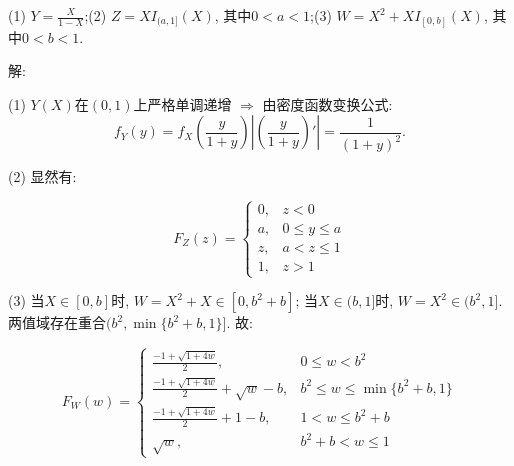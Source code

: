 \documentclass[standard]{ExBook}
\begin{document}
\begin{qitems}
\begin{bbox}
\begin{shaded}
(1) $Y=\frac{X}{1-X}$;\qquad(2) $Z=XI_{(a,1]}(X)$, 其中$0 < a < 1$;\qquad(3) $W=X^2+XI_{[0,b]}(X)$, 其中$0 < b < 1$.
    \end{shaded}
    \end{bbox}

\vspace{-5em}

    \begin{bbox}
解: 

(1) $Y(X)$在$(0,1)$上严格单调递增 $\Longrightarrow$ 由密度函数变换公式:
$$f_{Y}(y)=f_{X}(\displaystyle\frac{y}{1+y})\left|\left(\displaystyle\frac{y}{1+y}\right)'\right|=\displaystyle\frac{1}{(1+y)^2}.$$
    \end{bbox}

\vspace{-5em}

    \begin{bbox}
(2) 显然有:
\vspace{-2em}
\begin{center}
\begin{equation}
    F_{Z}(z)=
    \left\{
    \begin{array}{cl}
        \nonumber
        0, &z<0\\
        a, &0\leq y\leq a\\
        z, &a<z\leq 1\\
        1, &z>1
    \end{array}
    \right.
\end{equation}
\end{center}
(3) 当$X\in[0,b]$时, $W=X^2+X\in[0,b^2+b]$; 当$X\in(b,1]$时, $W=X^2\in(b^2,1]$. 两值域存在重合$(b^2,\min\{b^2+b,1\}]$. 故:
\vspace{-2em}
\begin{center}
\begin{equation}
    F_{W}(w)=
    \left\{
    \begin{array}{cl}
        \nonumber
        \displaystyle\frac{-1+\sqrt{1+4w}}{2}, &0\leq w<b^2\\
        \displaystyle\frac{-1+\sqrt{1+4w}}{2}+\sqrt{w}-b, &b^2\leq w\leq\min\{b^2+b,1\}\\
        \displaystyle\frac{-1+\sqrt{1+4w}}{2}+1-b, &1< w\leq b^2+b\\
        \sqrt{w}, &b^2+b<w\leq 1
    \end{array}
    \right.
\end{equation}
\end{center}
    \end{bbox}


\end{qitems}
\end{document}
